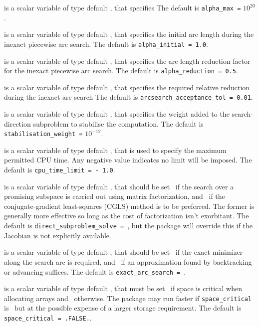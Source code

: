 \documentclass{galahad}
\begin{document}
\begin{description}
 is a scalar variable of type default \realdp, that specifies
The default is {\tt alpha\_max =} $10^{20}$.

 is a scalar variable of type default \realdp, that
specifies the initial arc length during the inexact piecewise arc search.
The default is {\tt alpha\_initial = 1.0}.

 is a scalar variable of type default \realdp, that
specifies the arc length reduction factor for the inexact piecewise arc search.
The default is {\tt alpha\_reduction = 0.5}.

 is a scalar variable of type default \realdp,
that specifies the required relative reduction during the inexact arc search
The default is {\tt arcsearch\_acceptance\_tol = 0.01}.

 is a scalar variable of type default \realdp,
that specifies the weight added to the search-direction subproblem to 
stabilise the computation.
The default is {\tt stabilisation\_weight =} $10^{-12}$.

 is a scalar variable of type default \realdp,
that is used to specify the maximum permitted CPU time. Any negative
value indicates no limit will be imposed. The default is
{\tt cpu\_time\_limit = - 1.0}.

 is a scalar variable of type default \logical,
that should be set \true\ if the search over a promising subspace is
carried out using matrix factorization, and \false\ if the conjugate-gradient
least-squares (CGLS) method is to be preferred. The former is generally
more effective so long as the cost of factorization isn't exorbitant.
The default is {\tt direct\_subproblem\_solve = \true}, but the
package will override this if the Jacobian is not explicitly available.

 is a scalar variable of type default \logical,
that should be set \true\ if the exact minimizer along the search arc is
required, and \false\ if an approximation found by backtracking or
advancing suffices.
The default is {\tt exact\_arc\_search = \true}.


 is a scalar variable of type default \logical,
that must be set \true\ if space is critical when allocating arrays
and  \false\ otherwise. The package may run faster if
{\tt space\_critical} is \false\ but at the possible expense of a larger
storage requirement. The default is {\tt space\_critical = .FALSE.}.


\end{description}
\end{document}
